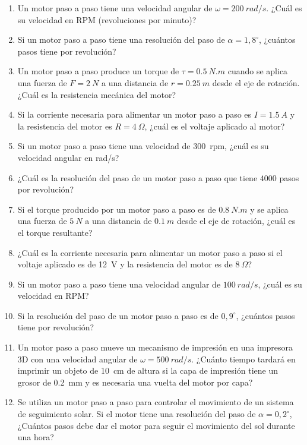 \documentclass[../main]{subfiles}
\begin{document}
\begin{enumerate}
  \item Un motor paso a paso tiene una velocidad angular de $\omega = \qty{200}{rad/s}$. ¿Cuál es su velocidad en RPM (revoluciones por minuto)?
  \item Si un motor paso a paso tiene una resolución del paso de $\alpha = 1,8^\circ$, ¿cuántos pasos tiene por revolución?
  \item Un motor paso a paso produce un torque de $\tau = \qty{0,5}{N.m}$ cuando se aplica una fuerza de $F = \qty{2}{N}$ a una distancia de $r = \qty{0,25}{m}$ desde el eje de rotación. ¿Cuál es la resistencia mecánica del motor?
  \item Si la corriente necesaria para alimentar un motor paso a paso es $I = \qty{1,5}{A}$ y la resistencia del motor es $R = \qty{4}{\Omega}$, ¿cuál es el voltaje aplicado al motor?
  \item Si un motor paso a paso tiene una velocidad de \qty{300}{rpm}, ¿cuál es su velocidad angular en rad/s?
  \item ¿Cuál es la resolución del paso de un motor paso a paso que tiene $4000$ pasos por revolución?
  \item Si el torque producido por un motor paso a paso es de $\qty{0,8}{N.m}$ y se aplica una fuerza de $\qty{5}{N}$ a una distancia de $\qty{0,1}{m}$ desde el eje de rotación, ¿cuál es el torque resultante?
  \item ¿Cuál es la corriente necesaria para alimentar un motor paso a paso si el voltaje aplicado es de \qty{12}{V} y la resistencia del motor es de $\qty{8}{\Omega}$?
  \item Si un motor paso a paso tiene una velocidad angular de $\qty{100}{rad/s}$, ¿cuál es su velocidad en RPM?
  \item Si la resolución del paso de un motor paso a paso es de $0,9^\circ$, ¿cuántos pasos tiene por revolución?
  \item Un motor paso a paso mueve un mecanismo de impresión en una impresora 3D con una velocidad angular de $\omega = \qty{500}{rad/s}$. ¿Cuánto tiempo tardará en imprimir un objeto de \qty{10}{cm} de altura si la capa de impresión tiene un grosor de \qty{0,2}{mm} y es necesaria una vuelta del motor por capa?
  \item Se utiliza un motor paso a paso para controlar el movimiento de un sistema de seguimiento solar. Si el motor tiene una resolución del paso de $\alpha = 0,2^\circ$, ¿Cuántos pasos debe dar el motor para seguir el movimiento del sol durante una hora?

\end{enumerate}
\end{document}
